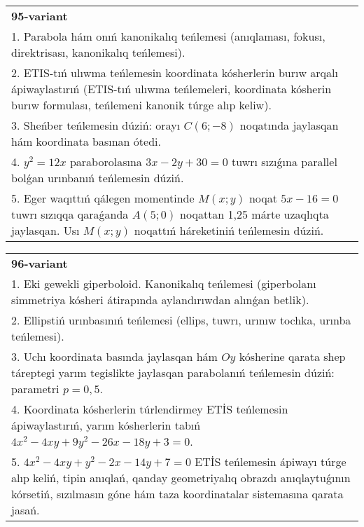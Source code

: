 \documentclass{article}
\begin{document}
\begin{tabular}{m{17cm}}
\textbf{95-variant}\\
1. Parabola hám onıń kanonikalıq teńlemesi (anıqlaması, fokusı, direktrisası, kanonikalıq teńlemesi).\\

2. ETIS-tıń ulıwma teńlemesin koordinata kósherlerin burıw arqalı ápiwaylastırıń (ETIS-tıń ulıwma teńlemeleri, koordinata kósherin burıw formulası, teńlemeni kanonik túrge alıp keliw).\\

3. Sheńber teńlemesin dúziń: orayı $C (6 ;-8) $ noqatında jaylasqan hám koordinata basınan ótedi.\\

4. $y^{2} = 12x$ paraborolasına $3x - 2y + 30 = 0$ tuwrı sızıǵına parallel bolǵan urınbanıń teńlemesin dúziń.  \\

5. Eger waqıttıń qálegen momentinde $M(x;y)$ noqat $5x - 16 = 0$ tuwrı sızıqqa qaraǵanda $A(5;0)$ noqattan 1,25 márte uzaqlıqta jaylasqan. Usı $M(x;y)$ noqattıń háreketiniń teńlemesin dúziń.  
\end{tabular}
\vspace{1cm}


\begin{tabular}{m{17cm}}
\textbf{96-variant}\\
1. Eki gewekli giperboloid. Kanonikalıq teńlemesi (giperbolanı simmetriya kósheri átirapında aylandırıwdan alınǵan betlik).\\

2. Ellipstiń urınbasınıń teńlemesi (ellips, tuwrı, urınıw tochka, urınba teńlemesi).\\

3. Uchı koordinata basında jaylasqan hám $Oy$ kósherine qarata shep táreptegi yarım tegislikte jaylasqan parabolanıń teńlemesin dúziń: parametri $p=0,5$.\\

4. Koordinata kósherlerin túrlendirmey ETİS teńlemesin ápiwaylastırıń, yarım kósherlerin tabıń $4x^{2} - 4xy + 9y^{2} - 26x - 18y + 3 = 0$.\\

5. $4x^{2} - 4xy + y^{2} - 2x - 14y + 7 = 0$ ETİS teńlemesin ápiwayı túrge alıp keliń, tipin anıqlań, qanday geometriyalıq obrazdı anıqlaytuǵının kórsetiń, sızılmasın góne hám taza koordinatalar sistemasına qarata jasań.  
\end{tabular}
\vspace{1cm}
\end{document}
